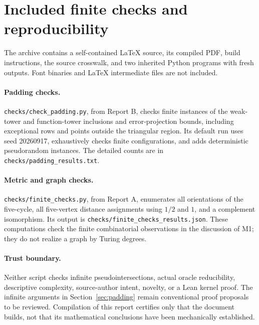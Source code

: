 \documentclass[11pt,a4paper]{article}
\theoremstyle{definition}\newtheorem{definition}[theorem]{Definition}
\theoremstyle{remark}\newtheorem{remark}[theorem]{Remark}
\begin{document}
\section{Included finite checks and reproducibility}
\label{app:checks}
The archive contains a self-contained LaTeX source, its compiled PDF, build instructions, the source crosswalk, and two inherited Python programs with fresh outputs. Font binaries and LaTeX intermediate files are not included.

\paragraph{Padding checks.}
\texttt{checks/check\_padding.py}, from Report B, checks finite instances of the weak-tower and function-tower inclusions and error-projection bounds, including exceptional rows and points outside the triangular region. Its default run uses seed 20260917, exhaustively checks finite configurations, and adds deterministic pseudorandom instances. The detailed counts are in \texttt{checks/padding\_results.txt}.

\paragraph{Metric and graph checks.}
\texttt{checks/finite\_checks.py}, from Report A, enumerates all orientations of the five-cycle, all five-vertex distance assignments using $1/2$ and $1$, and a complement isomorphism. Its output is \texttt{checks/finite\_checks\_results.json}. These computations check the finite combinatorial observations in the discussion of M1; they do not realize a graph by Turing degrees.

\paragraph{Trust boundary.}
Neither script checks infinite pseudointersections, actual oracle reducibility, descriptive complexity, source-author intent, novelty, or a Lean kernel proof. The infinite arguments in Section~\ref{sec:padding} remain conventional proof proposals to be reviewed. Compilation of this report certifies only that the document builds, not that its mathematical conclusions have been mechanically established.
\end{document}
